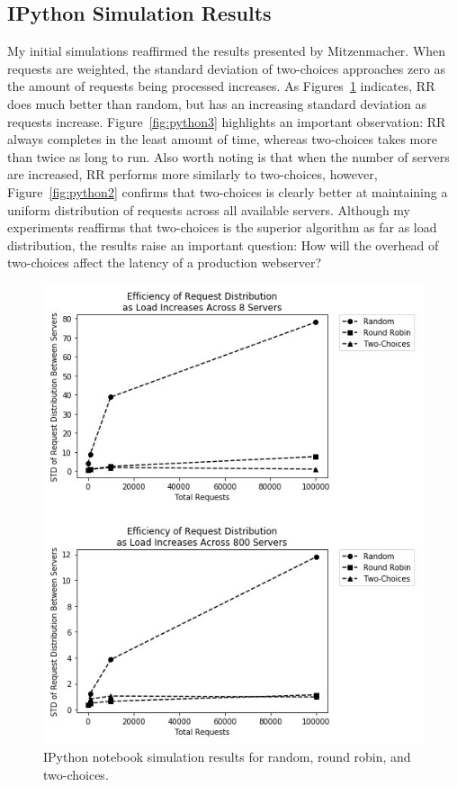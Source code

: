 \subsection{IPython Simulation Results}
My initial simulations reaffirmed the results presented by
Mitzenmacher. When requests are weighted, the standard deviation of
two-choices approaches zero as the amount of requests being processed
increases. As Figures~\ref{fig:python1} indicates, RR does much better
than random, but has an increasing standard deviation as requests
increase. Figure~\ref{fig:python3} highlights an important
observation: RR always completes in the least amount of time, whereas
two-choices takes more than twice as long to run. Also worth noting is
that when the number of servers are increased, RR performs more
similarly to two-choices, however, Figure~\ref{fig:python2} confirms
that two-choices is clearly better at maintaining a uniform
distribution of requests across all available servers. Although my
experiments reaffirms that two-choices is the superior algorithm as
far as load distribution, the results raise an important question: How
will the overhead of two-choices affect the latency of a production
webserver?

\begin{figure}
  \includegraphics[width=\linewidth]{figures/py/all3.jpg}
  \caption{IPython notebook simulation results for random, round robin, and two-choices.}
\label{fig:python1}
\end{figure}

